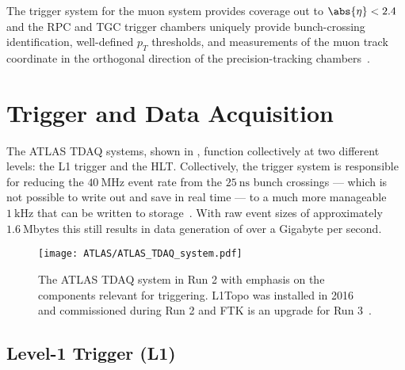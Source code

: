 The trigger system for the muon system provides coverage out to $\abs{\eta} < 2.4$ and the \gls{RPC} and \gls{TGC} trigger chambers uniquely provide bunch-crossing identification, well-defined $p_{T}$ thresholds, and measurements of the muon track coordinate in the orthogonal direction of the precision-tracking chambers~\cite{PERF-2007-01}.

\section{Trigger and Data Acquisition}\label{sec:ATLAS_TDAQ}

The ATLAS \gls{TDAQ} systems, shown in , function collectively at two different levels: the L1 trigger and the \gls{HLT}.
Collectively, the trigger system is responsible for reducing the $40~\mathrm{MHz}$ event rate from the $25~\mathrm{ns}$ bunch crossings --- which is not possible to write out and save in real time --- to a much more manageable $1~\mathrm{kHz}$ that can be written to storage~\cite{TRIG-2016-01}.
With raw event sizes of approximately $1.6~\mathrm{Mbytes}$ this still results in data generation of over a Gigabyte per second.

\begin{figure}[htbp]
 \centering
 \texttt{[image: ATLAS/ATLAS\_TDAQ\_system.pdf]}
 \caption[The ATLAS \gls{TDAQ} system in Run 2 with emphasis on the components relevant for triggering.]{%
  The ATLAS \gls{TDAQ} system in Run 2 with emphasis on the components relevant for triggering.
  L1Topo was installed in 2016 and commissioned during Run 2 and FTK is an upgrade for Run 3~\cite{TRIG-2016-01}.}\label{fig:ATLAS_TDAQ_system}
\end{figure}

\subsection{Level-1 Trigger (L1)}\label{sec:ATLAS_L1_trigger}

